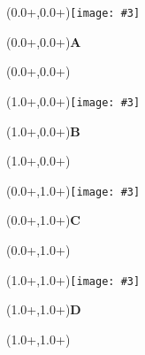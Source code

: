 \documentclass{article}
\newlength{\panelWidth} \newlength{\panelHeight}
\newlength{\labXshift} \newlength{\labYshift}
\newlength{\picXshift} \newlength{\picYshift}
\newlength{\txtXshift} \newlength{\txtYshift}
\newlength{\picWidth}
\newcommand{\txt}[3]{\begin{textblock*}{\panelWidth}(#1+\txtXshift,#2+\txtYshift){#3}\end{textblock*}}
\newcommand{\lab}[3]{\begin{textblock*}{\panelWidth}(#1+\labXshift,#2+\labYshift)\textbf{\LARGE #3}\end{textblock*}}
\newcommand{\pic}[3]{\begin{textblock*}{\panelWidth}(#1+\picXshift,#2+\picYshift)\texttt{[image: \#3]}\end{textblock*}}
\newcommand{\fig}[5]{  \pic{#1}{#2}{#4} \lab{#1}{#2}{#3} \txt{#1}{#2}{#5} }
\begin{document}


\fig{0.0\panelWidth}{0.0\panelHeight}{A}{./Figure5A.pdf}{}
\fig{1.0\panelWidth}{0.0\panelHeight}{B}{./Figure5B1.pdf}{}
\fig{0.0\panelWidth}{1.0\panelHeight}{C}{./Figure5C.pdf}{}
\fig{1.0\panelWidth}{1.0\panelHeight}{D}{./Figure5D.pdf}{}
\end{document}
